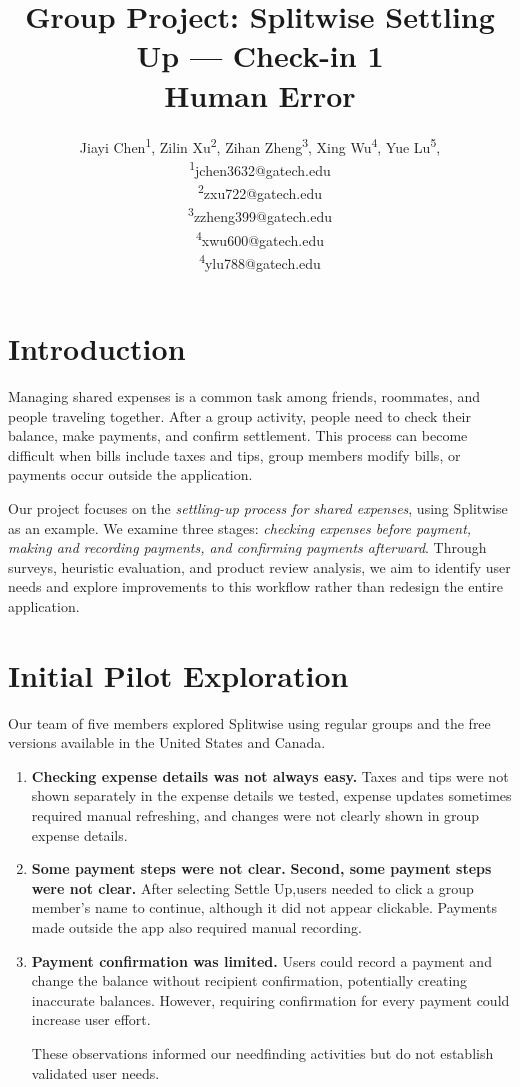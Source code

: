 \documentclass[letterpaper]{jdf}
\title{Group Project: Splitwise Settling Up --- Check-in 1\\Human Error}
\author{
Jiayi Chen\textsuperscript{1},
Zilin Xu\textsuperscript{2},
Zihan Zheng\textsuperscript{3},
Xing Wu\textsuperscript{4},
Yue Lu\textsuperscript{5},
\\
\small
\textsuperscript{1}jchen3632@gatech.edu\\
\textsuperscript{2}zxu722@gatech.edu\\
\textsuperscript{3}zzheng399@gatech.edu\\
\textsuperscript{4}xwu600@gatech.edu\\
\textsuperscript{4}ylu788@gatech.edu
}
\begin{document}
\maketitle

\section{Introduction}

Managing shared expenses is a common task among friends, roommates, and people traveling together. After a group activity, people need to check their balance, make payments, and confirm settlement. This process can become difficult when bills include taxes and tips, group members modify bills, or payments occur outside the application.

Our project focuses on the \textit{settling-up process for shared expenses}, using Splitwise as an example. We examine three stages: \textit{checking expenses before payment, making and recording payments, and confirming payments afterward}. Through surveys, heuristic evaluation, and product review analysis, we aim to identify user needs and explore improvements to this workflow rather than redesign the entire application.


\section{Initial Pilot Exploration}

Our team of five members explored Splitwise using regular groups and the free versions available in the United States and Canada. 
\begin{enumerate}[label=\arabic*)]
\item \textbf{Checking expense details was not always easy.}
Taxes and tips were not shown separately in the expense details we tested, expense updates sometimes required manual refreshing, and changes were not clearly shown in group expense details.

\item \textbf{Some payment steps were not clear.}
\textbf{Second, some payment steps were not clear.} After selecting Settle Up,users needed to click a group member's name to continue, although it did not appear clickable. Payments made outside the app also required manual recording.
\item \textbf{Payment confirmation was limited.}
Users could record a payment and change the balance without recipient confirmation, potentially creating inaccurate balances. However, requiring confirmation for every payment could increase user effort.

These observations informed our needfinding activities but do not establish validated user needs.
\end{enumerate}
\end{document}
